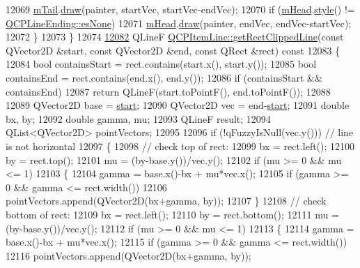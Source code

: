 \begin{DoxyCode}
12069       \hyperlink{a00036_ab8ed61dfe15bbb1cbf9b95eae95e242f}{mTail}.\hyperlink{a00046_ac4b2fa94bd27b2f008b5fc090fcd7c0b}{draw}(painter, startVec, startVec-endVec);
12070     \textcolor{keywordflow}{if} (\hyperlink{a00036_a51603f28ab7ddb1c1a95ea384791d3ed}{mHead}.\hyperlink{a00046_aea324dbfddbca9895ca8a3a968671299}{style}() != \hyperlink{a00046_a5ef16e6876b4b74959c7261d8d4c2cd5aca12d500f50cd6871766801bac30fb03}{QCPLineEnding::esNone})
12071       \hyperlink{a00036_a51603f28ab7ddb1c1a95ea384791d3ed}{mHead}.\hyperlink{a00046_ac4b2fa94bd27b2f008b5fc090fcd7c0b}{draw}(painter, endVec, endVec-startVec);
12072   \}
12073 \}
12074 
\hypertarget{a00115_source_l12082}{}\hyperlink{a00036_a36e8620019a221ccea4357f0287b81c2}{12082} QLineF \hyperlink{a00036_a36e8620019a221ccea4357f0287b81c2}{QCPItemLine::getRectClippedLine}(\textcolor{keyword}{const} QVector2D &start, \textcolor{keyword}{const} 
      QVector2D &end, \textcolor{keyword}{const} QRect &rect)\textcolor{keyword}{ const}
12083 \textcolor{keyword}{}\{
12084   \textcolor{keywordtype}{bool} containsStart = rect.contains(start.x(), start.y());
12085   \textcolor{keywordtype}{bool} containsEnd = rect.contains(end.x(), end.y());
12086   \textcolor{keywordflow}{if} (containsStart && containsEnd)
12087     \textcolor{keywordflow}{return} QLineF(start.toPointF(), end.toPointF());
12088   
12089   QVector2D base = \hyperlink{a00036_a602da607a09498b0f152ada1d6851bc5}{start};
12090   QVector2D vec = end-\hyperlink{a00036_a602da607a09498b0f152ada1d6851bc5}{start};
12091   \textcolor{keywordtype}{double} bx, by;
12092   \textcolor{keywordtype}{double} gamma, mu;
12093   QLineF result;
12094   QList<QVector2D> pointVectors;
12095 
12096   \textcolor{keywordflow}{if} (!qFuzzyIsNull(vec.y())) \textcolor{comment}{// line is not horizontal}
12097   \{
12098     \textcolor{comment}{// check top of rect:}
12099     bx = rect.left();
12100     by = rect.top();
12101     mu = (by-base.y())/vec.y();
12102     \textcolor{keywordflow}{if} (mu >= 0 && mu <= 1)
12103     \{
12104       gamma = base.x()-bx + mu*vec.x();
12105       \textcolor{keywordflow}{if} (gamma >= 0 && gamma <= rect.width())
12106         pointVectors.append(QVector2D(bx+gamma, by));
12107     \}
12108     \textcolor{comment}{// check bottom of rect:}
12109     bx = rect.left();
12110     by = rect.bottom();
12111     mu = (by-base.y())/vec.y();
12112     \textcolor{keywordflow}{if} (mu >= 0 && mu <= 1)
12113     \{
12114       gamma = base.x()-bx + mu*vec.x();
12115       \textcolor{keywordflow}{if} (gamma >= 0 && gamma <= rect.width())
12116         pointVectors.append(QVector2D(bx+gamma, by));

\end{DoxyCode}
